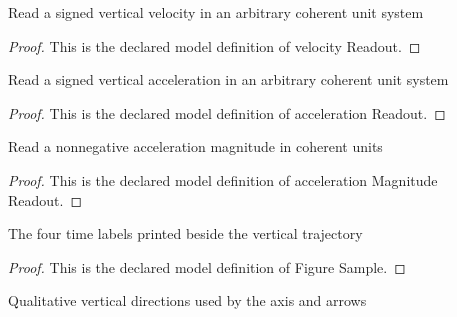 \begin{definition}
  \label{def:physics:phyx-mini-0795:phyxminiproblems-problemphyxmini0795-velocityreadout}
  Read a signed vertical velocity in an arbitrary coherent unit system
\end{definition}
\begin{proof}
  This is the declared model definition of velocity Readout.
\end{proof}
\begin{definition}
  \label{def:physics:phyx-mini-0795:phyxminiproblems-problemphyxmini0795-accelerationreadout}
  Read a signed vertical acceleration in an arbitrary coherent unit system
\end{definition}
\begin{proof}
  This is the declared model definition of acceleration Readout.
\end{proof}
\begin{definition}
  \label{def:physics:phyx-mini-0795:phyxminiproblems-problemphyxmini0795-accelerationmagnitudereadout}
  Read a nonnegative acceleration magnitude in coherent units
\end{definition}
\begin{proof}
  This is the declared model definition of acceleration Magnitude Readout.
\end{proof}
\begin{definition}
  \label{def:physics:phyx-mini-0795:phyxminiproblems-problemphyxmini0795-figuresample}
  The four time labels printed beside the vertical trajectory
\end{definition}
\begin{proof}
  This is the declared model definition of Figure Sample.
\end{proof}
\begin{definition}
  \label{def:physics:phyx-mini-0795:phyxminiproblems-problemphyxmini0795-verticaldirection}
  Qualitative vertical directions used by the axis and arrows
\end{definition}
